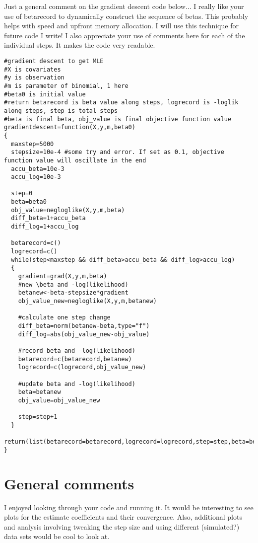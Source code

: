\documentclass[paper=a4, fontsize=11pt]{scrartcl} %
\numberwithin{equation}{section} %
\numberwithin{figure}{section} %
\numberwithin{table}{section} %
\begin{document}
Just a general comment on the gradient descent code below... I really like your use of betarecord to dynamically construct the sequence of betas.  This probably helps with speed and upfront memory allocation.  I will use this technique for future code I write! I also appreciate your use of comments here for each of the individual steps.  It makes the code very readable.

\begin{lstlisting}
#gradient descent to get MLE
#X is covariates
#y is observation
#m is parameter of binomial, 1 here
#beta0 is initial value
#return betarecord is beta value along steps, logrecord is -loglik along steps, step is total steps
#beta is final beta, obj_value is final objective function value
gradientdescent=function(X,y,m,beta0)
{
  maxstep=5000
  stepsize=10e-4 #some try and error. If set as 0.1, objective function value will oscillate in the end
  accu_beta=10e-3
  accu_log=10e-3
  
  step=0
  beta=beta0
  obj_value=negloglike(X,y,m,beta)
  diff_beta=1+accu_beta
  diff_log=1+accu_log
  
  betarecord=c()
  logrecord=c()
  while(step<maxstep && diff_beta>accu_beta && diff_log>accu_log)
  {
    gradient=grad(X,y,m,beta)
    #new \beta and -log(likelihood)
    betanew<-beta-stepsize*gradient
    obj_value_new=negloglike(X,y,m,betanew)
    
    #calculate one step change
    diff_beta=norm(betanew-beta,type="f")
    diff_log=abs(obj_value_new-obj_value)
    
    #record beta and -log(likelihood)
    betarecord=c(betarecord,betanew)
    logrecord=c(logrecord,obj_value_new)
    
    #update beta and -log(likelihood)
    beta=betanew
    obj_value=obj_value_new
    
    step=step+1
  }
  return(list(betarecord=betarecord,logrecord=logrecord,step=step,beta=beta,obj_value=obj_value))
}
\end{lstlisting}

\section{General comments}

I enjoyed looking through your code and running it.  It would be interesting to see plots for the estimate coefficients and their convergence.  Also, additional plots and analysis involving tweaking the step size and using different (simulated?) data sets would be cool to look at. 
\end{document}
